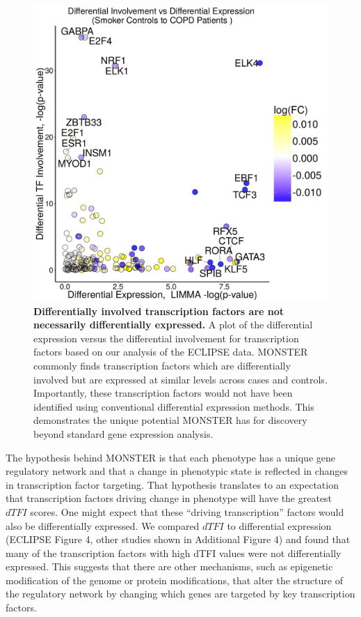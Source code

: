 \begin{figure}
\includegraphics[width=1\linewidth]{figures/figure4}
\caption{\textbf{Differentially involved transcription factors are not necessarily differentially expressed.} A plot of the differential expression versus the differential involvement for transcription factors based on our analysis of the ECLIPSE data. MONSTER commonly finds transcription factors which are differentially involved but are expressed at similar levels across cases and controls. Importantly, these transcription factors would not have been identified using conventional differential expression methods. This demonstrates the unique potential MONSTER has for discovery beyond standard gene expression analysis.}
\label{fig:expression}
\end{figure}

The hypothesis behind MONSTER is that each phenotype has a unique gene regulatory network and that a change in phenotypic state is reflected in changes in transcription factor targeting. That hypothesis translates to an expectation that transcription factors driving change in phenotype will have the greatest $dTFI$ scores. One might expect that these ``driving transcription'' factors would also be differentially expressed.  We compared $dTFI$ to differential expression (ECLIPSE Figure 4, other studies shown in Additional Figure 4) and found that many of the transcription factors with high dTFI values were not differentially expressed. This suggests that there are other mechanisms, such as epigenetic modification of the genome or protein modifications, that alter the structure of the regulatory network by changing which genes  are targeted by key transcription factors. 


